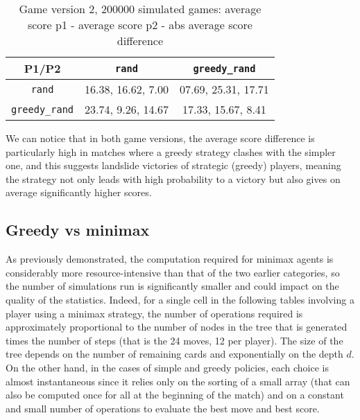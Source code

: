 \documentclass[conference]{IEEEtran}
\begin{document}
\begin{table}[hbt!]
\begin{center}
\begin{tabular}{|c||c|c|}
    \hline
    P1/P2 &  \verb|rand| & \verb|greedy_rand|\\
    \hline \hline
    \verb|rand| & 16.38, 16.62, 7.00 & 07.69, 25.31, 17.71\\
    \hline
    \verb|greedy_rand| & 23.74, 9.26, 14.67 & 17.33, 15.67, 8.41 \\
    \hline
\end{tabular}
\caption{Game version 2, 200000 simulated games: average score p1 - average score p2 - abs average score difference}
\end{center}
\end{table}

We can notice that in both game versions, the average score difference is particularly high in matches where a greedy strategy clashes with the simpler one, and this suggests landslide victories of strategic (greedy) players, meaning the strategy not only leads with high probability to a victory but also gives on average significantly higher scores. 

\subsection{Greedy vs minimax}

As previously demonstrated, the computation required for minimax agents is considerably more resource-intensive than that of the two earlier categories, so the number of simulations run is significantly smaller and could impact on the quality of the statistics.
Indeed, for a single cell in the following tables involving a player using a minimax strategy, the number of operations required is approximately proportional to the number of nodes in the tree that is generated times the number of steps (that is the 24 moves, 12 per player). 
The size of the tree depends on the number of remaining cards and exponentially on the depth $d$. On the other hand, in the cases of simple and greedy policies, each choice is almost instantaneous since it relies only on the sorting of a small array (that can also be computed once for all at the beginning of the match) and on a constant and small number of operations to evaluate the best move and best score.
\end{document}
